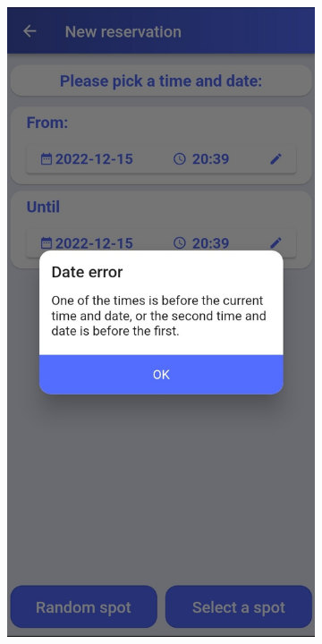 \begin{appendices}
\begin{figure}[htp]
     \centering
     \begin{subfigure}[b]{0.30\textwidth}
         \centering
         \includegraphics[width=\textwidth]{images/dialog1.jpg}

\end{subfigure}
\end{figure}
\end{appendices}
